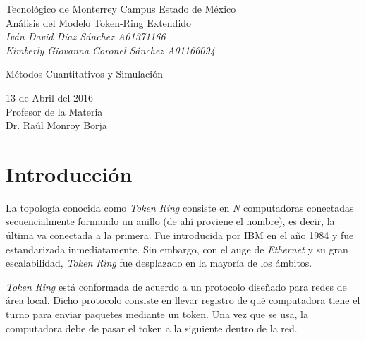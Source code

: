 \documentclass[12pt,letterpaper,oneside]{article}
\begin{document}
  \begin{titlepage}
    \centering
    {\LARGE Tecnológico de Monterrey Campus Estado de México \\}
    \vspace{2.5cm}
    {\Large Análisis del Modelo Token-Ring Extendido \\}
    \vspace{2.5cm}
    {\Large\slshape Iván David Díaz Sánchez \sffamily A01371166 \\}
    \vspace{0.5cm}
    {\Large\slshape Kimberly Giovanna Coronel Sánchez \sffamily A01166094 \\}
    \vspace{2.5cm}
    {\Large Métodos Cuantitativos y Simulación \par}
    \vspace{1.5cm}
    {\large 13 de Abril del 2016 \\}
    \vfill
    \large Profesor de la Materia\\
    \large Dr. Raúl Monroy Borja
    \vfill
  \end{titlepage}
  
  \begin{abstract}
    En este escrito, se modeló y analizó una arquitectura Token-Ring con 3 computadoras conectadas. El análisis abarca el comportamiento dinámico de dicho sistema bajo condiciones normales y escenarios simulados, los cuales suponen la modificación de diversas tasas en el envío de paquetes.
  \end{abstract}
  
  \section{Introducción}
    La topología conocida como \textit{Token Ring} consiste en \textit{N} computadoras conectadas secuencialmente formando un anillo (de ahí proviene el nombre), es decir, la última va conectada a la primera. Fue introducida por IBM en el año 1984 y fue estandarizada inmediatamente. Sin embargo, con el auge de \textit{Ethernet} y su gran escalabilidad, \textit{Token Ring} fue desplazado en la mayoría de los ámbitos.
    
    \textit{Token Ring} está conformada de acuerdo a un protocolo diseñado para redes de área local. Dicho protocolo consiste en llevar registro de qué computadora tiene el turno para enviar paquetes mediante un token. Una vez que se usa, la computadora debe de pasar el token a la siguiente dentro de la red.\par
    
\end{document}
